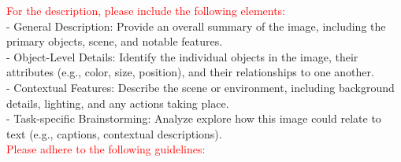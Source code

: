 \begin{figure*}[t]
\begin{prompt}[title={Prompt: Synthesizing Retrieval Data (Only Query Image)}, label=prompt:ret_one_image]
\textcolor{red}{For the description, please include the following elements:}\\
- General Description: Provide an overall summary of the image, including the primary objects, scene, and notable features.\\
- Object-Level Details: Identify the individual objects in the image, their attributes (e.g., color, size, position), and their relationships to one another.\\
- Contextual Features: Describe the scene or environment, including background details, lighting, and any actions taking place.\\
- Task-specific Brainstorming: Analyze explore how this image could relate to text (e.g., captions, contextual descriptions).\\

\textcolor{red}{Please adhere to the following guidelines:}


\end{prompt}
\end{figure*}
